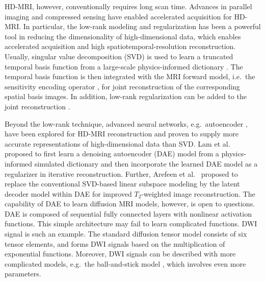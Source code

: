 \documentclass[journal,twoside,web]{ieeecolor}
\begin{document}
	HD-MRI, however, conventionally requires long scan time.
	Advances in parallel imaging
	\cite{roemer_1990_pi,sodickson_1997_smash,
	pruessmann_1999_sense,pruessmann_2001_gsense,griswold_2002_grappa}
	and compressed sensing
	\cite{lustig_2007_cs,block_2007_cs,liang_2007_psf}
	have enabled accelerated acquisition for HD-MRI.
	In particular, the low-rank modeling and regularization \cite{cai_2010_svt}
	has been a powerful tool in reducing the dimensionality of high-dimensional data,
	which enables accelerated acquisition and high spatiotemporal-resolution reconstruction.
	Usually, singular value decomposition (SVD) is used to
	learn a truncated temporal basis function from
	a large-scale physics-informed dictionary
	\cite{huang_2012_t2basis,lam_2014_spice,mcgivney_2014_svdmrf}.
	The temporal basis function is then integrated
	with the MRI forward model,
	i.e.~the sensitivity encoding operator \cite{pruessmann_2001_gsense},
	for joint reconstruction of the corresponding spatial basis images.
	In addition, low-rank regularization can be added to the joint reconstruction
	\cite{tamir_2017_t2shuffling}.

	Beyond the low-rank technique,
	advanced neural networks, e.g.~autoencoder \cite{hinton_2006_ae},
	have been explored for HD-MRI reconstruction and
	proven to supply more accurate representations of high-dimensional data than SVD.
	Lam et al.~\cite{lam_2019_mrsi,mani_2021_qmodel} proposed
	to first learn a denoising autoencoder (DAE) model
	from a physics-informed simulated dictionary
	and then incorporate the learned DAE model as a regularizer
	in iterative reconstruction.
	Further, Arefeen et al.~\cite{arefeen_2023_latent} proposed
	to replace the conventional SVD-based linear subspace modeling
	\cite{huang_2012_t2basis}
	by the latent decoder model within DAE
	for improved $T_2$-weighted image reconstruction.
	The capability of DAE to learn diffusion MRI models, however,
	is open to questions.
	DAE is composed of sequential fully connected layers
	with nonlinear activation functions.
	This simple architecture may fail to learn complicated functions.
	DWI signal is such an example.
	The standard diffusion tensor model \cite{basser_1994_dmri}
	consists of six tensor elements,
	and forms DWI signals based on the multiplication of exponential functions.
	Moreover, DWI signals can be described with more complicated models,
	e.g.~the ball-and-stick model \cite{behrens_2003_ballstick},
	which involves even more parameters.
\end{document}
